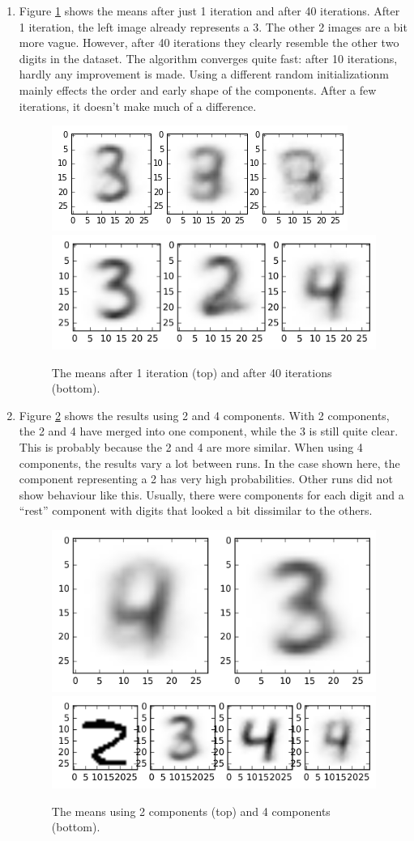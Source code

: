 \documentclass[a4paper]{article}
\begin{document}
\begin{enumerate}
\item Figure \ref{fig:means} shows the means after just 1 iteration and after 40 iterations. After 1 iteration, the left image already represents a 3. The other 2 images are a bit more vague. However, after 40 iterations they clearly resemble the other two digits in the dataset. The algorithm converges quite fast: after 10 iterations, hardly any improvement is made. Using a different random initializationm mainly effects the order and early shape of the components. After a few iterations, it doesn't make much of a difference.

\begin{figure}
\centering
\includegraphics[width=.6\linewidth]{figures/means_init.png} \\
\includegraphics[width=.6\linewidth]{figures/means.png}
\caption{The means after 1 iteration (top) and after 40 iterations (bottom).}
\label{fig:means}
\end{figure}
\item Figure \ref{fig:diff_means} shows the results using 2 and 4 components. With 2 components, the 2 and 4 have merged into one component, while the 3 is still quite clear. This is probably because the 2 and 4 are more similar. When using 4 components, the results vary a lot between runs. In the case shown here, the component representing a 2 has very high probabilities. Other runs did not show behaviour like this. Usually, there were components for each digit and a ``rest'' component with digits that looked a bit dissimilar to the others.
\begin{figure}
\centering
\includegraphics[width=.6\linewidth]{figures/means2.png} \\
\includegraphics[width=.6\linewidth]{figures/means4.png}
\caption{The means using 2 components (top) and 4 components (bottom).}
\label{fig:diff_means}
\end{figure}


\end{enumerate}
\end{document}
